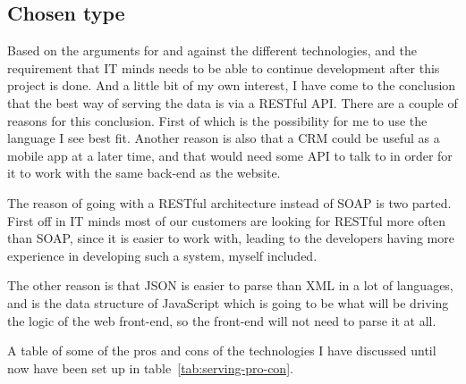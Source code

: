 \subsection{Chosen type }
\label{sub:Chosen type}
Based on the arguments for and against the different technologies, and the
requirement that IT minds needs to be able to continue development after this
project is done. And a little bit of my own interest, I have come to the
conclusion that the best way of serving the data is via a RESTful API. There are
a couple of reasons for this conclusion. First of which is the possibility for
me to use the language I see best fit. Another reason is also that a CRM could
be useful as a mobile app at a later time, and that would need some API to talk
to in order for it to work with the same back-end as the website. 

The reason of going with a RESTful architecture instead of SOAP is two parted.
First off in IT minds most of our customers are looking for RESTful more often
than SOAP, since it is easier to work with, leading to the developers having
more experience in developing such a system, myself included. 

The other reason is that JSON is easier to parse than XML in a lot of languages,
and is the data structure of  JavaScript which is going to be what will be
driving the logic of the web front-end, so the front-end will not need to parse it
at all. 

A table of some of the pros and cons of the technologies I have discussed until
now have been set up in table~\ref{tab:serving-pro-con}. 

\begin{table}[h]
  \caption{Pros and cons of different ways of serving the data}
  \label{tab:serving-pro-con}
\end{table}

